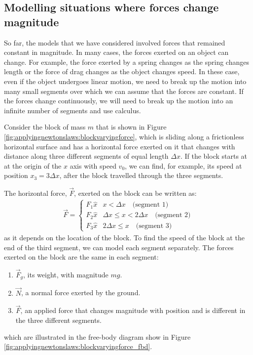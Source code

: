\subsection{Modelling situations where forces change magnitude}
So far, the models that we have considered involved forces that remained constant in magnitude. In many cases, the forces exerted on an object can change. For example, the force exerted by a spring changes as the spring changes length or the force of drag changes as the object changes speed. In these case, even if the object undergoes linear motion, we need to break up the motion into many small segments over which we can assume that the forces are constant. If the forces change continuously, we will need to break up the motion into an infinite number of segments and use calculus.

Consider the block of mass $m$ that is shown in Figure \ref{fig:applyingnewtonslaws:blockvaryingforce}, which is sliding along a frictionless horizontal surface and has a  horizontal force exerted on it that changes with distance along three different segments of equal length $\Delta x$. If the block starts at  at the origin of the $x$ axis with speed $v_0$, we can find, for example, its speed at position $x_3=3\Delta x$, after the block travelled through the three segments.


The horizontal force, $\vec F$, exerted on the block can be written as:
\begin{align*}
  \vec F =
  \begin{cases}
    F_1\hat x & x<\Delta x \quad \text{(segment 1)}\\
    F_2\hat x & \Delta x \leq x< 2\Delta x \quad \text{(segment 2)}\\
    F_3\hat x & 2\Delta x \leq x\quad \text{(segment 3)}
  \end{cases}
\end{align*}
as it depends on the location of the block. To find the speed of the block at the end of the third segment, we can model each segment separately. The forces exerted on the block are the same in each segment:
\begin{enumerate}
\item $\vec F_g$, its weight, with magnitude $mg$.
\item $\vec N$, a normal force exerted by the ground.
\item $\vec F$, an applied force that changes magnitude with position and is different in the three different segments.
\end{enumerate}
which are illustrated in the free-body diagram show in Figure \ref{fig:applyingnewtonslaws:blockvaryingforce_fbd}.

